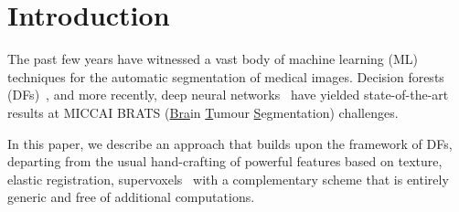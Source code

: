 
\section{Introduction}
\label{sec:intro}

The past few years have witnessed a vast body of machine learning (ML) techniques for 
the automatic segmentation of medical images. Decision forests (DFs)~\cite{zikic2012decision,tustison2013ants},
and more recently, deep neural networks~\cite{pereira2015deep} have yielded state-of-the-art results at 
MICCAI BRATS (\uline{Bra}in \uline{T}umour \uline{S}egmentation) challenges. 

In this paper, we describe an approach that builds upon the framework of DFs, departing from the usual 
hand-crafting of powerful features based on \eg texture, elastic registration, supervoxels~\cite{tustison2015optimal,geremia2013spatially} with a complementary scheme that is entirely generic and 
free of additional computations.  
